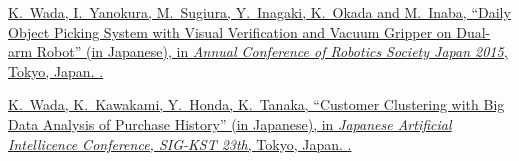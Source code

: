 \documentclass[letterpaper,MMMyyyy,nonstop]{simpleresumecv}
\begin{document}
\begin{body}
\GapNoBreak
\NumberedItem{{\CharSpace}[2]}
\href{http://rsj2015.rsj-web.org/}
{\underline{K.~Wada}, I.~Yanokura, M.~Sugiura, Y.~Inagaki, K.~Okada and M.~Inaba,
``Daily Object Picking System with Visual Verification and Vacuum Gripper on Dual-arm Robot'' (in Japanese),
in \textit{Annual Conference of Robotics Society Japan 2015},
Tokyo, Japan.
.}

\GapNoBreak
\NumberedItem{{\CharSpace}[1]}
\href{http://www.sigkst.org/index.php?site_id=&page=\%C2\%E823\%B2\%F3\%B8\%A6\%B5\%E6\%B2\%F1}
{\underline{K.~Wada}, K.~Kawakami, Y.~Honda, K.~Tanaka,
``Customer Clustering with Big Data Analysis of Purchase History'' (in Japanese),
in \textit{Japanese Artificial Intellicence Conference, SIG-KST 23th},
Tokyo, Japan.
.}


%
%
%
%


\end{body}
\end{document}
